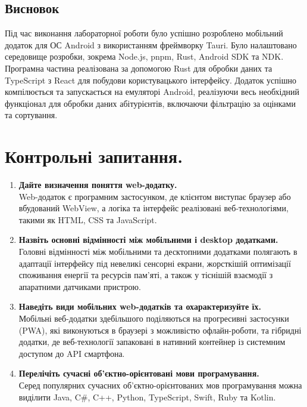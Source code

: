 \documentclass[14pt, a4paper]{extreport}
\begin{document}
	\subsection*{Висновок}
	
	Під час виконання лабораторної роботи було успішно розроблено мобільний додаток для ОС Android з використанням фреймворку Tauri. Було налаштовано середовище розробки, зокрема Node.js, pnpm, Rust, Android SDK та NDK. Програмна частина реалізована за допомогою Rust для обробки даних та TypeScript з React для побудови користувацького інтерфейсу. Додаток успішно компілюється та запускається на емуляторі Android, реалізуючи весь необхідний функціонал для обробки даних абітурієнтів, включаючи фільтрацію за оцінками та сортування.
	
	\section*{Контрольні запитання.}
	
	\begin{enumerate}
		\item \textbf{Дайте визначення поняття web-додатку.} \\ Web-додаток є програмним застосунком, де клієнтом виступає браузер або вбудований WebView, а логіка та інтерфейс реалізовані веб-технологіями, такими як HTML, CSS та JavaScript.
		
		\item \textbf{Назвіть основні відмінності між мобільними і desktop додатками.} \\ Головні відмінності між мобільними та десктопними додатками полягають в адаптації інтерфейсу під невеликі сенсорні екрани, жорсткішій оптимізації споживання енергії та ресурсів пам'яті, а також у тіснішій взаємодії з апаратними датчиками пристрою.
		
		\item \textbf{Наведіть види мобільних web-додатків та охарактеризуйте їх.} \\ Мобільні веб-додатки здебільшого поділяються на прогресивні застосунки (PWA), які виконуються в браузері з можливістю офлайн-роботи, та гібридні додатки, де веб-технології запаковані в нативний контейнер із системним доступом до API смартфона.
		
		\item \textbf{Перелічіть сучасні об'єктно-орієнтовані мови програмування.} \\ Серед популярних сучасних об'єктно-орієнтованих мов програмування можна виділити Java, C\#, C++, Python, TypeScript, Swift, Ruby та Kotlin.
	\end{enumerate}
	
\end{document}
